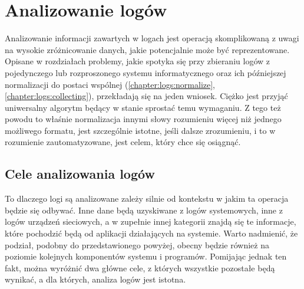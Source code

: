 \section{Analizowanie logów}
\label{chapter:logs:analysis}

Analizowanie informacji zawartych w logach jest operacją skomplikowaną z uwagi na wysokie zróżnicowanie danych, jakie
potencjalnie może być reprezentowane. Opisane w rozdziałach problemy, jakie spotyka się
przy zbieraniu logów z pojedynczego lub rozproszonego systemu informatycznego oraz ich 
późniejszej normalizacji do postaci wspólnej (\ref{chapter:logs:normalize}, \ref{chapter:logs:collecting}), 
przekładają się na jeden wniosek. Ciężko jest przyjąć uniwersalny algorytm będący w stanie sprostać temu wymaganiu.
Z tego też powodu to właśnie normalizacja innymi słowy rozumieniu więcej niż jednego możliwego formatu, jest
szczególnie istotne, jeśli dalsze zrozumieniu, i to w rozumienie zautomatyzowane, jest celem, który chce się 
osiągnąć.

    \subsection{Cele analizowania logów}
    
    To dlaczego logi są analizowane zależy silnie od kontekstu w jakim ta operacja będzie się odbywać. 
    Inne dane będą uzyskiwane z logów systemowych, inne z logów urządzeń sieciowych, a w zupełnie innej
    kategorii znajdą się te informacje, które pochodzić będą od aplikacji działających na systemie. Warto
    nadmienić, że podział, podobny do przedstawionego powyżej, obecny będzie również na poziomie
    kolejnych komponentów systemu i programów. Pomijając jednak ten fakt, 
    można wyróżnić dwa główne cele, z których wszystkie pozostałe będą wynikać,
    a dla których, analiza logów jest istotna.
    

